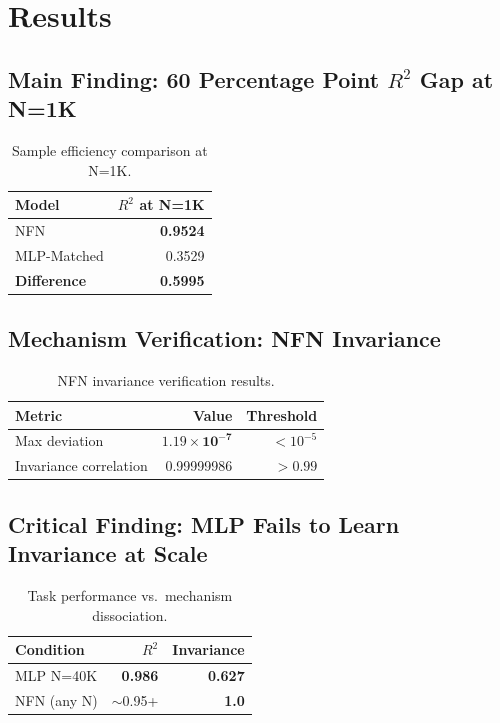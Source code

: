 \section{Results}

\subsection{Main Finding: 60 Percentage Point $R^2$ Gap at N=1K}

\begin{table}[h]
\centering
\begin{tabular}{@{}lr@{}}
\toprule
Model & $R^2$ at N=1K \\
\midrule
NFN & \textbf{0.9524} \\
MLP-Matched & 0.3529 \\
\textbf{Difference} & \textbf{0.5995} \\
\bottomrule
\end{tabular}
\caption{Sample efficiency comparison at N=1K.}
\label{tab:main_result}
\end{table}

\subsection{Mechanism Verification: NFN Invariance}

\begin{table}[h]
\centering
\begin{tabular}{@{}lrr@{}}
\toprule
Metric & Value & Threshold \\
\midrule
Max deviation & $\mathbf{1.19 \times 10^{-7}}$ & $< 10^{-5}$ \\
Invariance correlation & 0.99999986 & $> 0.99$ \\
\bottomrule
\end{tabular}
\caption{NFN invariance verification results.}
\label{tab:invariance}
\end{table}

\subsection{Critical Finding: MLP Fails to Learn Invariance at Scale}

\begin{table}[h]
\centering
\begin{tabular}{@{}lrr@{}}
\toprule
Condition & $R^2$ & Invariance \\
\midrule
MLP N=40K & \textbf{0.986} & \textbf{0.627} \\
NFN (any N) & $\sim$0.95+ & \textbf{1.0} \\
\bottomrule
\end{tabular}
\caption{Task performance vs.\ mechanism dissociation.}
\label{tab:dissociation}
\end{table}

